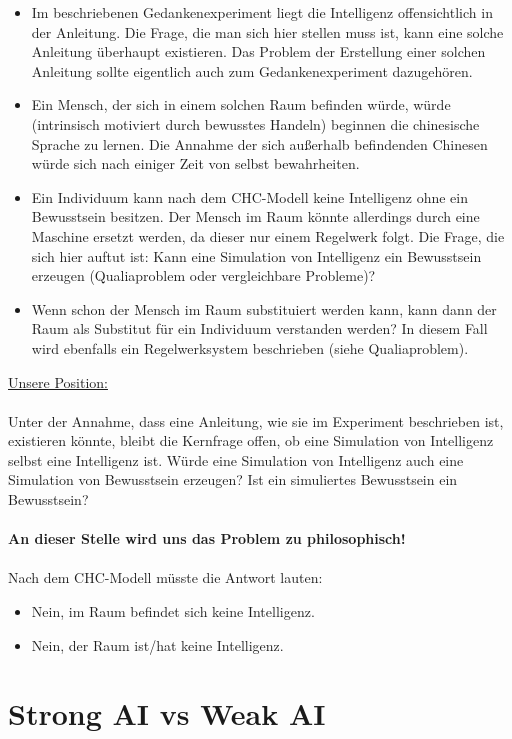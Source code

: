 \documentclass{article}
\begin{document}
\begin{itemize}
\item Im beschriebenen Gedankenexperiment liegt die Intelligenz offensichtlich in der Anleitung. Die Frage, die man sich hier stellen muss ist, kann eine solche Anleitung überhaupt existieren. Das Problem der Erstellung einer solchen Anleitung sollte eigentlich auch zum Gedankenexperiment dazugehören.
\item Ein Mensch, der sich in einem solchen Raum befinden würde, würde (intrinsisch motiviert durch bewusstes Handeln) beginnen die chinesische Sprache zu lernen. Die Annahme der sich außerhalb befindenden Chinesen würde sich nach einiger Zeit von selbst bewahrheiten. 
\item Ein Individuum kann nach dem CHC-Modell keine Intelligenz ohne ein Bewusstsein besitzen. Der Mensch im Raum könnte allerdings durch eine Maschine ersetzt werden, da dieser nur einem Regelwerk folgt. Die Frage, die sich hier auftut ist: Kann eine Simulation von Intelligenz ein Bewusstsein erzeugen (Qualiaproblem oder vergleichbare Probleme)?
\item Wenn schon der Mensch im Raum substituiert werden kann, kann dann der Raum als Substitut für ein Individuum verstanden werden? In diesem Fall wird ebenfalls ein Regelwerksystem beschrieben (siehe Qualiaproblem).
\end{itemize}
\underline{Unsere Position:}\\
\\
Unter der Annahme, dass eine Anleitung, wie sie im Experiment beschrieben ist, existieren könnte, bleibt die Kernfrage offen, ob eine Simulation von Intelligenz selbst eine Intelligenz ist. Würde eine Simulation von Intelligenz auch eine Simulation von Bewusstsein erzeugen? Ist ein simuliertes Bewusstsein ein Bewusstsein?\\
\\
\textbf{An dieser Stelle wird uns das Problem zu philosophisch!}\\
\\
Nach dem CHC-Modell müsste die Antwort lauten:
\begin{itemize}
\item Nein, im Raum befindet sich keine Intelligenz.
\item Nein, der Raum ist/hat keine Intelligenz.
\end{itemize}

\newpage

\section{Strong AI vs Weak AI}
\end{document}
